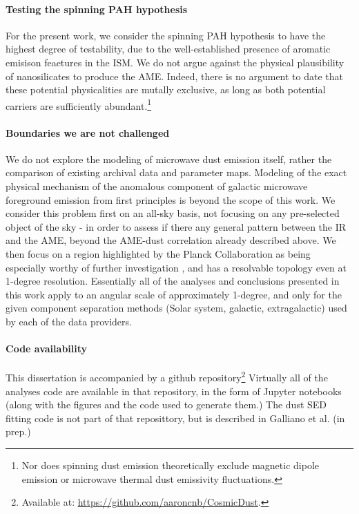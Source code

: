   \paragraph{Testing the spinning PAH hypothesis}
    For the present work, we consider the spinning PAH hypothesis to have the highest degree of testability, due to the well-established presence of aromatic emisison feaetures in the ISM.  We do not argue against the physical plausibility of nanosilicates to produce the AME. Indeed, there is no argument to date that these potential physicalities are mutally exclusive, as long as both potential carriers are sufficiently abundant.\footnote{Nor does spinning dust emission theoretically exclude magnetic dipole emission or microwave thermal dust emissivity fluctuations.}

  \paragraph{Boundaries we are not challenged}
    We do not explore the modeling of microwave dust emission itself, rather the comparison of existing archival data and parameter maps. Modeling of the exact physical mechanism of the anomalous component of galactic microwave foreground emission from first principles is beyond the scope of this work. We consider this problem first on an all-sky basis, not focusing on any pre-selected object of the sky - in order to assess if there any general pattern between the IR and the AME, beyond the AME-dust correlation already described above. We then focus on a region highlighted by the Planck Collaboration as being especially worthy of further investigation \citep{planck15X}, and has a resolvable topology even at 1-degree resolution. Essentially all of the analyses and conclusions presented in this work apply to an angular scale of approximately 1-degree, and only for the given component separation methods (Solar system, galactic, extragalactic) used by each of the data providers.

  \paragraph{Code availability}
    This dissertation is accompanied by a github repository\footnote{Available at: \url{https://github.com/aaroncnb/CosmicDust}.} Virtually all of the analyses code are available in that repository, in the form of Jupyter notebooks (along with the figures and the code used to generate them.) The dust SED fitting code is not part of that reposittory, but is described in Galliano et al. (in prep.)
